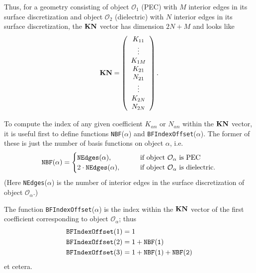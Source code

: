 \documentclass[letterpaper]{article}
\begin{document}
Thus, for a geometry consisting of object $\mathcal{O}_1$ (PEC)
with $M$ interior edges in its surface discretization
and object $\mathcal{O}_2$ (dielectric) with $N$ interior edges
in its surface discretization, the $\mathbf{KN}$ vector has dimension
$2N+M$ and looks like
$$ \mathbf{KN}=\left(\begin{array}{c}
   K_{11} \\ 
   \vdots \\
   K_{1M} \\ 
   K_{21} \\ 
   N_{21} \\ 
   \vdots \\
   K_{2N} \\ 
   N_{2N}
   \end{array}\right).
$$

To compute the index of any given coefficient $K_{\alpha n}$ 
or $N_{\alpha n}$ within the $\mathbf{KN}$ vector,
it is useful first to define functions \texttt{NBF}($\alpha$) 
and \texttt{BFIndexOffset}($\alpha$). The former of these 
is just the number of basis functions on object $\alpha$,
i.e.
$$ \texttt{NBF}(\alpha) = 
   \begin{cases}
   \texttt{NEdges}(\alpha), \qquad &\text{if object $\mathcal{O}_\alpha$
                                          is PEC} \\
   2\cdot \tt{NEdges}(\alpha), 
                        \qquad &\text{if object $\mathcal{O}_\alpha$
                                      is dielectric.} \\
   \end{cases}
$$
(Here \texttt{NEdges}($\alpha$) is the number of interior edges 
in the surface discretization of object $\mathcal{O}_\alpha$.)

The function \texttt{BFIndexOffset}($\alpha$) is the index
within the $\mathbf{KN}$ vector of the first coefficient corresponding
to object $\mathcal{O}_\alpha$; thus 
\begin{align*}
 \texttt{BFIndexOffset}(1) &= 1 \\
 \texttt{BFIndexOffset}(2) &= 1 + \tt{NBF}(1) \\
 \texttt{BFIndexOffset}(3) &= 1 + \tt{NBF}(1) + \tt{NBF}(2) \\
\end{align*}
et cetera.
\end{document}
